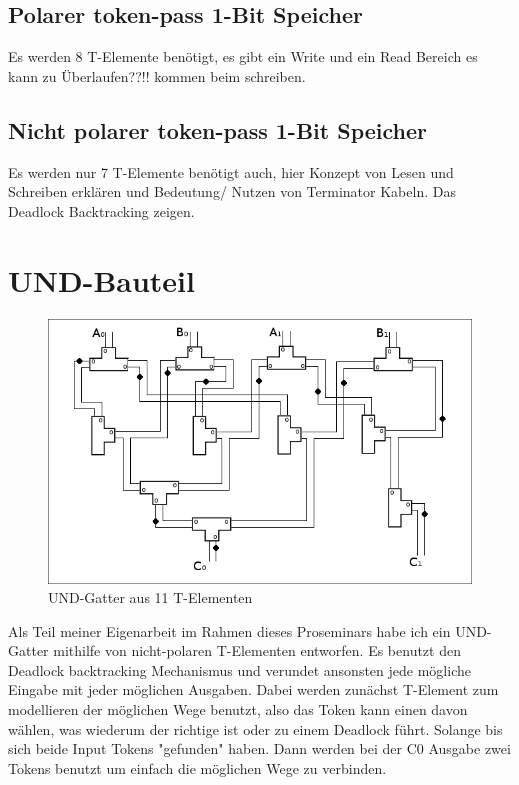\subsection{Polarer token-pass 1-Bit Speicher}
Es werden 8 T-Elemente benötigt, es gibt ein Write und ein Read Bereich
es kann zu
Überlaufen??!!
kommen beim schreiben.  

\subsection{Nicht polarer token-pass 1-Bit Speicher}
Es werden nur 7 T-Elemente benötigt auch, hier Konzept von Lesen und Schreiben
erklären und Bedeutung/ Nutzen von Terminator Kabeln.
Das Deadlock Backtracking zeigen.

\section{UND-Bauteil}

\begin{figure}[h]
    \centering
    \includegraphics[width=15cm]{bilder/UndGatter.png}
    \caption{UND-Gatter aus 11 T-Elementen}
\end{figure}    


Als Teil meiner Eigenarbeit im Rahmen dieses Proseminars habe ich ein UND-Gatter
mithilfe von nicht-polaren T-Elementen entworfen.
%
Es benutzt den Deadlock backtracking Mechanismus und verundet ansonsten jede 
mögliche Eingabe mit jeder möglichen Ausgaben. 
%
Dabei werden zunächst T-Element zum modellieren der möglichen Wege benutzt, also 
das Token kann einen davon wählen, was wiederum der richtige ist oder zu einem Deadlock
führt. Solange bis sich beide Input Tokens "gefunden" haben.
%
Dann werden bei der C0 Ausgabe zwei Tokens benutzt um einfach die möglichen Wege zu 
verbinden.


